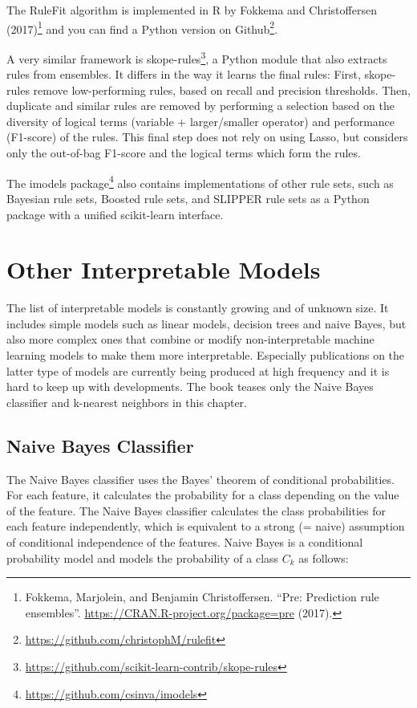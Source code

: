 \documentclass[
  10pt,
]{scrbook}
\renewcommand{\href}[2]{#2\footnote{\url{#1}}}
\begin{document}
The RuleFit algorithm is implemented in R by Fokkema and Christoffersen (2017)\footnote{Fokkema, Marjolein, and Benjamin Christoffersen. ``Pre: Prediction rule ensembles''. \url{https://CRAN.R-project.org/package=pre} (2017).} and you can find a \href{https://github.com/christophM/rulefit}{Python version on Github}.

A very similar framework is \href{https://github.com/scikit-learn-contrib/skope-rules}{skope-rules}, a Python module that also extracts rules from ensembles.
It differs in the way it learns the final rules:
First, skope-rules remove low-performing rules, based on recall and precision thresholds.
Then, duplicate and similar rules are removed by performing a selection based on the diversity of logical terms (variable + larger/smaller operator) and performance (F1-score) of the rules.
This final step does not rely on using Lasso, but considers only the out-of-bag F1-score and the logical terms which form the rules.

The \href{https://github.com/csinva/imodels}{imodels package} also contains implementations of other rule sets, such as Bayesian rule sets, Boosted rule sets, and SLIPPER rule sets as a Python package with a unified scikit-learn interface.

\newpage

\hypertarget{other-interpretable}{%
\section{Other Interpretable Models}\label{other-interpretable}}

The list of interpretable models is constantly growing and of unknown size.
It includes simple models such as linear models, decision trees and naive Bayes, but also more complex ones that combine or modify non-interpretable machine learning models to make them more interpretable.
Especially publications on the latter type of models are currently being produced at high frequency and it is hard to keep up with developments.
The book teases only the Naive Bayes classifier and k-nearest neighbors in this chapter.

\hypertarget{naive-bayes-classifier}{%
\subsection{Naive Bayes Classifier}\label{naive-bayes-classifier}}

The Naive Bayes classifier uses the Bayes' theorem of conditional probabilities.
For each feature, it calculates the probability for a class depending on the value of the feature.
The Naive Bayes classifier calculates the class probabilities for each feature independently, which is equivalent to a strong (= naive) assumption of conditional independence of the features.
Naive Bayes is a conditional probability model and models the probability of a class \(C_k\) as follows:
\end{document}
